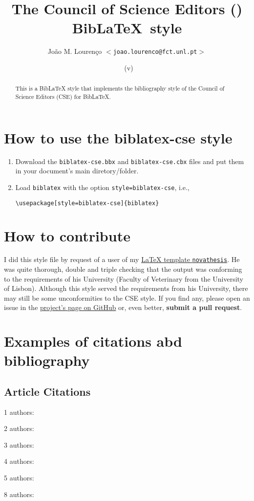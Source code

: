 \documentclass[
  a4paper, %
  11pt, %
]{article}
\title{The Council of Science Editors (\textsf{\filename}) Bib\LaTeX\ style}
\author{João M. Lourenço $<$\texttt{joao.lourenco@fct.unl.pt}$>$}
\date{\filedate\ (v\fileversion)}
\newcommand{\novathesis}{\texttt{novathesis}}
\newcommand{\nauthors}[1]{#1 authors: }
\begin{document}
  
  \maketitle

\begin{abstract}
This is a BibLaTeX style that implements the bibliography style of the Council of Science Editors (CSE) for BibLaTeX.
\end{abstract}


\section{How to use the biblatex-cse style}

\begin{enumerate}
  \item Download the \texttt{biblatex-cse.bbx} and \texttt{biblatex-cse.cbx} files and put them in your document's main diretory/folder.
  \item Load \texttt{biblatex} with the option \texttt{style=biblatex-cse}, i.e.,
\begin{verbatim}
\usepackage[style=biblatex-cse]{biblatex}  
\end{verbatim}
\end{enumerate}


\section{How to contribute}

I did this style file by request of a user of my \href{https://github.com/joaomlourenco/novathesis}{LaTeX template \novathesis}. He was quite thorough, double and triple checking that the output was conforming to the requirements of his University (Faculty of Veterinary from the University of Lisbon). Although this \texttt{\filename} style served the requirements from his University, there may still be some unconformities to the CSE style. If you find any, please open an issue in the \href{https://github.com/joaomlourenco/biblatex-cse}{project's page on GitHub} or, even better, \textbf{submit a pull request}.


\section{Examples of citations abd bibliography}
  
\subsection{Article Citations}
\indent
\par\nauthors{1}\cite{Duddington1955}
\par\nauthors{2}\cite{Asa2011}
\par\nauthors{3}\cite{Migaki1982}
\par\nauthors{4}\cite{Lysek1982}
\par\nauthors{5}\cite{Carvalho2007}
\par\nauthors{8}\cite{Riadigos2014}
\end{document}
